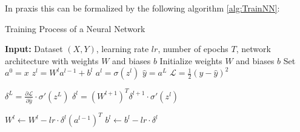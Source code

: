 

In praxis this can be formalized by the following algorithm \ref{alg:TrainNN}: 


\begin{algorithm}[H]
	\caption{Training Process of a Neural Network}
	\label{alg:TrainNN}
	\begin{algorithmic}[htb]
		\State \textbf{Input:} Dataset $(X, Y)$, learning rate $lr$, number of epochs $T$, network architecture with weights $W$ and biases $b$
		\State Initialize weights $W$ and biases $b$
		 
		\State Set $a^0 = x$
		\State $z^l = W^l a^{l-1} + b^l$
		\State $a^l = \sigma(z^l)$
		\EndFor
		\State $\hat{y} = a^L$ 
		\State $\mathcal{L} = \frac{1}{2}(y - \hat{y})^2$ 
		
		
		\State $\delta^L = \frac{\partial \mathcal{L}}{\partial \hat{y}} \cdot \sigma'(z^L)$
		\State $\delta^l = (W^{l+1})^T \delta^{l+1} \cdot \sigma'(z^l)$
		\EndFor
		
		\State $W^l \leftarrow W^l - lr \cdot \delta^l (a^{l-1})^T$ 
		\State $b^l \leftarrow b^l - lr \cdot \delta^l$ 
		\EndFor
		\EndFor
		\EndFor
		\EndProcedure
	\end{algorithmic}
\end{algorithm}

 